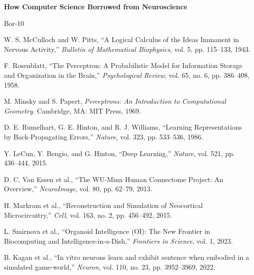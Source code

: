 \documentclass[12pt, a4paper]{article}
\begin{document}
\vspace{1em}
{\noindent\bfseries How Computer Science Borrowed from Neuroscience}\par\smallskip
\begin{thebibliography}{Bor-10}

 W. S. McCulloch and W. Pitts, ``A Logical Calculus of the Ideas Immanent in
    Nervous Activity,'' \textit{Bulletin of Mathematical Biophysics}, vol. 5, pp. 115--133, 1943.

 F. Rosenblatt, ``The Perceptron: A Probabilistic Model for Information
    Storage and Organization in the Brain,'' \textit{Psychological Review}, vol. 65, no. 6,
    pp. 386--408, 1958.

 M. Minsky and S. Papert, \textit{Perceptrons: An Introduction to
    Computational Geometry}. Cambridge, MA: MIT Press, 1969.

 D. E. Rumelhart, G. E. Hinton, and R. J. Williams, ``Learning
    Representations by Back-Propagating Errors,'' \textit{Nature}, vol. 323, pp. 533--536, 1986.

 Y. LeCun, Y. Bengio, and G. Hinton, ``Deep Learning,'' \textit{Nature},
    vol. 521, pp. 436--444, 2015.

 D. C. Van Essen et al., ``The WU-Minn Human Connectome Project: An
    Overview,'' \textit{NeuroImage}, vol. 80, pp. 62--79, 2013.

 H. Markram et al., ``Reconstruction and Simulation of Neocortical
    Microcircuitry,'' \textit{Cell}, vol. 163, no. 2, pp. 456--492, 2015.

 L. Smirnova et al., ``Organoid Intelligence (OI): The New Frontier in
    Biocomputing and Intelligence-in-a-Dish,'' \textit{Frontiers in Science}, vol. 1, 2023.

 B. Kagan et al., ``In vitro neurons learn and exhibit sentence when embodied
    in a simulated game-world,'' \textit{Neuron}, vol. 110, no. 23, pp. 3952--3969, 2022.

\end{thebibliography}
\end{document}
